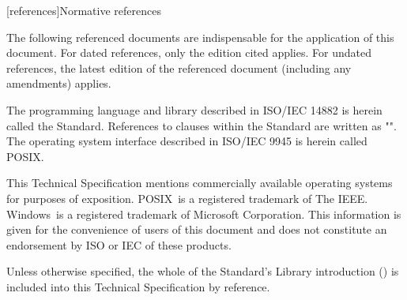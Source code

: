 
[references]{Normative references}

\pnum
The following referenced documents are indispensable for the application of this document. For dated references, only the edition cited applies. For undated references, the latest edition of the referenced document (including any amendments) applies.

\pnum
\enternote The programming language and library described in ISO/IEC 14882 is herein called the \Cpp Standard. References to clauses within the \Cpp Standard are written as "".  The operating system interface described in ISO/IEC 9945 is herein called POSIX. \exitnote

\pnum
This Technical Specification mentions commercially available operating systems for purposes of exposition.  POSIX\textregistered\ is a registered trademark of The IEEE. Windows\textregistered\ is a registered trademark of Microsoft Corporation. This information is given for the convenience of users of this document and does not constitute an endorsement by ISO or IEC of these products.

\pnum
Unless otherwise specified, the whole of the \Cpp Standard's Library introduction () is included into this Technical Specification by reference.


